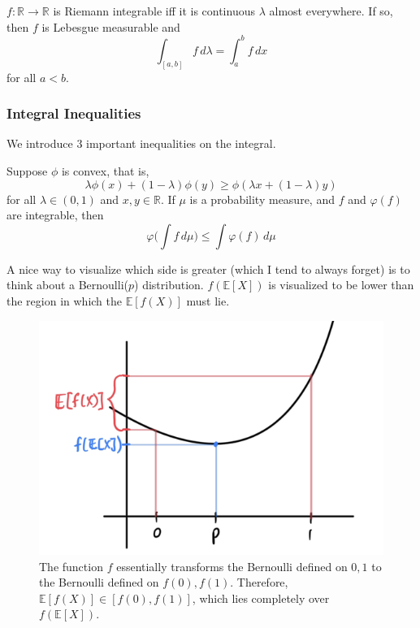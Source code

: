 \documentclass{article}
\begin{document}
      \begin{theorem}
        $f: \mathbb{R} \longrightarrow \mathbb{R}$ is Riemann integrable iff it is continuous $\lambda$ almost everywhere. If so, then $f$ is Lebesgue measurable and 
        \begin{equation}
          \int_{[a, b]} f \,d\lambda = \int_a^b f \, dx
        \end{equation}
        for all $a < b$. 
      \end{theorem}

    \subsubsection{Integral Inequalities}

      We introduce 3 important inequalities on the integral. 

      \begin{theorem}
        Suppose $\phi$ is convex, that is, 
        \begin{equation}
          \lambda \phi(x) + (1 - \lambda) \phi(y) \geq \phi (\lambda x + (1 - \lambda) y)
        \end{equation}
        for all $\lambda \in (0, 1)$ and $x, y \in \mathbb{R}$. If $\mu$ is a probability measure, and $f$ and $\varphi(f)$ are integrable, then 
        \begin{equation}
          \varphi\bigg( \int f \,d\mu \bigg) \leq \int \varphi(f) \,d\mu
        \end{equation}
      \end{theorem}

      A nice way to visualize which side is greater (which I tend to always forget) is to think about a Bernoulli($p$) distribution. $f(\mathbb{E}[X])$ is visualized to be lower than the region in which the $\mathbb{E}[f(X)]$ must lie. 

      \begin{figure}[H]
        \centering 
        \includegraphics[scale=0.4]{img/jensen_visual.png}
        \caption{The function $f$ essentially transforms the Bernoulli defined on $0, 1$ to the Bernoulli defined on $f(0), f(1)$. Therefore, $\mathbb{E}[f(X)] \in [f(0), f(1)]$, which lies completely over $f(\mathbb{E}[X])$.} 
        \label{fig:jensen_visual}
      \end{figure}
\end{document}
